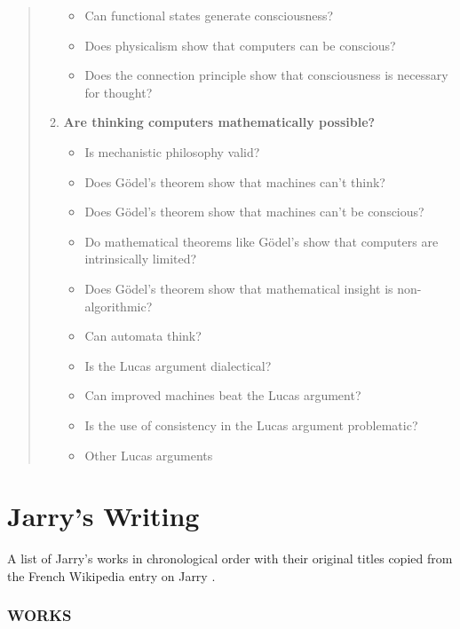 \begin{quotation}
\begin{enumerate}
\begin{itemize}
        \item Can functional states generate consciousness?
        \item Does physicalism show that computers can be conscious?
        \item Does the connection principle show that consciousness is necessary for thought?
      \end{itemize}
    \item \textbf{Are thinking computers mathematically possible?}
      \begin{itemize}
        \item Is mechanistic philosophy valid?
        \item Does G{\"o}del's theorem show that machines can't think?
        \item Does G{\"o}del's theorem show that machines can't be conscious?
        \item Do mathematical theorems like G{\"o}del's show that computers are intrinsically limited?
        \item Does G{\"o}del's theorem show that mathematical insight is non-algorithmic?
        \item Can automata think?
        \item Is the Lucas argument dialectical?
        \item Can improved machines beat the Lucas argument?
        \item Is the use of consistency in the Lucas argument problematic?
        \item Other Lucas arguments
      \end{itemize}
  \end{enumerate}
\end{quotation}


\section{Jarry's Writing}
\label{s:jarry}

A list of Jarry's works in chronological order with their original titles copied from the French Wikipedia entry on Jarry \autocite*{WikiJarry2016}.

\subsubsection{WORKS}

